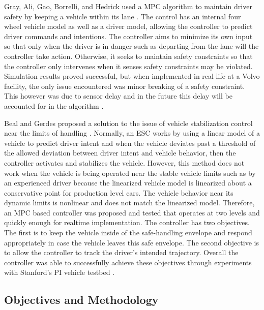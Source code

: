 \documentclass[12pt,onecolumn]{article}
\begin{document}
Gray, Ali, Gao, Borrelli, and Hedrick used a MPC algorithm to maintain driver safety by keeping a vehicle within its lane \cite{Ali&Gray2013}. The control has an internal four wheel vehicle model as well as a driver model, allowing the controller to predict driver commands and intentions. The controller aims to minimize its own input so that only when the driver is in danger such as departing from the lane will the controller take action. Otherwise, it seeks to maintain safety constraints so that the controller only intervenes when it senses safety constraints may be violated. Simulation results proved successful, but when implemented in real life at a Volvo facility, the only issue encountered was minor breaking of a safety constraint. This however was due to sensor delay and in the future this delay will be accounted for in the algorithm \cite{Ali&Gray2013}.

Beal and Gerdes proposed a solution to the issue of vehicle stabilization control near the limits of handling \cite{Beal&Gerdes2013}. Normally, an ESC works by using a linear model of a vehicle to predict driver intent and when the vehicle deviates past a threshold of the allowed deviation between driver intent and vehicle behavior, then the controller activates and stabilizes the vehicle. However, this method does not work when the vehicle is being operated near the stable vehicle limits such as by an experienced driver because the linearized vehicle model is linearized about a conservative point for production level cars. The vehicle behavior near its dynamic limits is nonlinear and does not match the linearized model. Therefore, an MPC based controller was proposed and tested that operates at two levels and quickly enough for realtime implementation. The controller has two objectives. The first is to keep the vehicle inside of the safe-handling envelope and respond appropriately in case the vehicle leaves this safe envelope. The second objective is to allow the controller to track the driver's intended trajectory. Overall the controller was able to successfully achieve these objectives through experiments with Stanford's PI vehicle testbed \cite{Beal&Gerdes2013}.








\subsection{Objectives and Methodology}\label{ss:ObjectivesMethodology}
\end{document}
